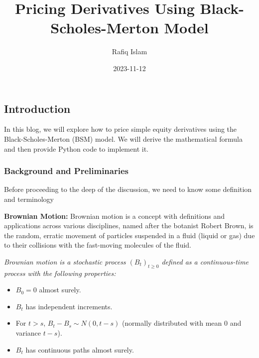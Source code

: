 \documentclass[
  letterpaper,
  DIV=11,
  numbers=noendperiod]{scrartcl}
\title{Pricing Derivatives Using Black-Scholes-Merton Model}
\author{Rafiq Islam}
\date{2023-11-12}
\providecommand{\tightlist}{%
  \setlength{\itemsep}{0pt}\setlength{\parskip}{0pt}}
\renewcommand*\contentsname{Table of contents}
\newcommand\contentsname{Table of contents}
\begin{document}
\maketitle

\renewcommand*\contentsname{Table of contents}
{
\setcounter{tocdepth}{4}
\tableofcontents
}

\subsection{Introduction}\label{introduction}

In this blog, we will explore how to price simple equity derivatives
using the Black-Scholes-Merton (BSM) model. We will derive the
mathematical formula and then provide Python code to implement it.

\subsubsection{Background and
Preliminaries}\label{background-and-preliminaries}

Before proceeding to the deep of the discussion, we need to know some
definition and terminology

\textbf{Brownian Motion:} Brownian motion is a concept with definitions
and applications across various disciplines, named after the botanist
Robert Brown, is the random, erratic movement of particles suspended in
a fluid (liquid or gas) due to their collisions with the fast-moving
molecules of the fluid.

\emph{Brownian motion is a stochastic process \((B_t)_{t \geq 0}\)
defined as a continuous-time process with the following properties:}

\begin{itemize}
\tightlist
\item
  \(B_0 = 0\) almost surely.
\item
  \(B_t\) has independent increments.
\item
  For \(t > s\), \(B_t - B_s \sim N(0, t-s)\) (normally distributed with
  mean 0 and variance \(t-s\)).
\item
  \(B_t\) has continuous paths almost surely.
\end{itemize}
\end{document}
